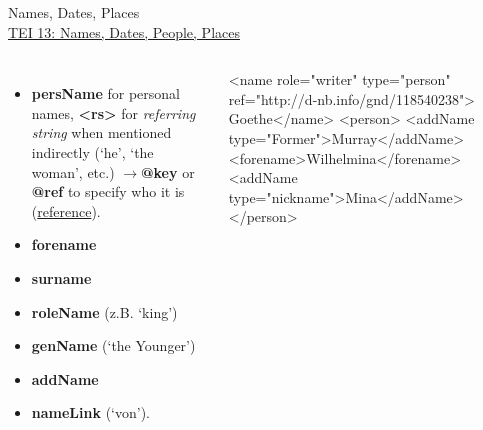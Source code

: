\begin{frame}[fragile]{Names, Dates, Places}
\footnotesize
{}\\
\href{http://www.tei-c.org/release/doc/tei-p5-doc/en/html/ND.html}{TEI 13: Names, Dates, People, Places} 

\begin{columns}
\begin{itemize}
    \item \textbf{persName} for personal names, \textbf{<rs>} for \emph{referring string} when mentioned indirectly (`he', `the woman', etc.) $\to $\textbf{@key} or \textbf{@ref} to specify who it is  (\href{http://www.tei-c.org/release/doc/tei-p5-doc/en/html/CO.html#CONARS}{reference}). \item \textbf{forename} 
    \item \textbf{surname} 
    \item \textbf{roleName} (z.B. `king') 
    \item  \textbf{genName} (`the Younger') 
    \item \textbf{addName} 
    \item \textbf{nameLink} (`von').
\end{itemize}

\begin{xmlcode}
<name role="writer" type="person"
ref="http://d-nb.info/gnd/118540238">
Goethe</name>
<person>
  <addName type="Former">Murray</addName>
  <forename>Wilhelmina</forename>
  <addName type="nickname">Mina</addName>
</person>
\end{xmlcode}
\end{columns}

\end{frame}




